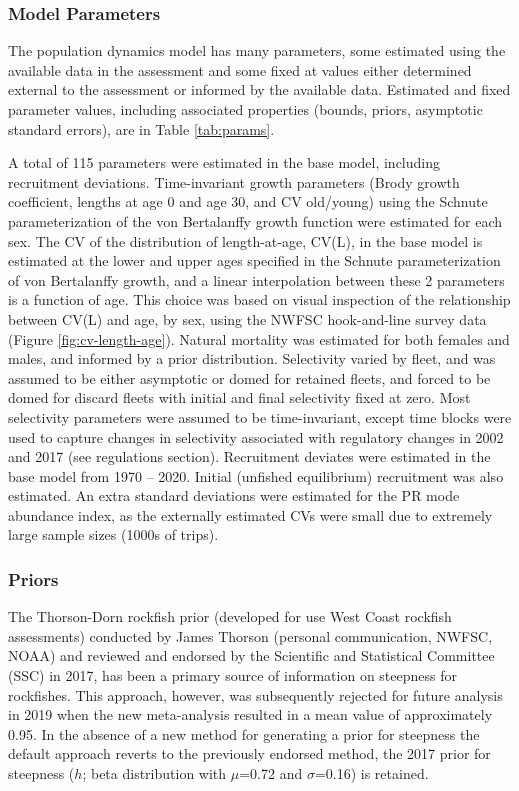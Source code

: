 \documentclass[
  english,
  a4paper,
]{article}
\begin{document}
\hypertarget{model-parameters}{%
\subsubsection{Model Parameters}\label{model-parameters}}

The population dynamics model has many parameters, some estimated using the available data in the assessment and some fixed at values either determined external to the assessment or informed by the available data. Estimated and fixed parameter values, including associated properties (bounds, priors, asymptotic standard errors), are in Table \ref{tab:params}.

A total of 115 parameters were estimated in the base model, including recruitment deviations. Time-invariant growth parameters (Brody growth coefficient, lengths at age 0 and age 30, and CV old/young) using the Schnute parameterization of the von Bertalanffy growth function were estimated for each sex. The CV of the distribution of length-at-age, CV(L), in the base model is estimated at the lower and upper ages specified in the Schnute parameterization of von Bertalanffy growth, and a linear interpolation between these 2 parameters is a function of age. This choice was based on visual inspection of the relationship between CV(L) and age, by sex, using the NWFSC hook-and-line survey data (Figure \ref{fig:cv-length-age}). Natural mortality was estimated for both females and males, and informed by a prior distribution. Selectivity varied by fleet, and was assumed to be either asymptotic or domed for retained fleets, and forced to be domed for discard fleets with initial and final selectivity fixed at zero. Most selectivity parameters were assumed to be time-invariant, except time blocks were used to capture changes in selectivity associated with regulatory changes in 2002 and 2017 (see regulations section). Recruitment deviates were estimated in the base model from 1970 -- 2020. Initial (unfished equilibrium) recruitment was also estimated. An extra standard deviations were estimated for the PR mode abundance index, as the externally estimated CVs were small due to extremely large sample sizes (1000s of trips).

\hypertarget{priors}{%
\subsubsection{Priors}\label{priors}}

The Thorson-Dorn rockfish prior (developed for use West Coast rockfish assessments) conducted by James Thorson (personal communication, NWFSC, NOAA) and reviewed and endorsed by the Scientific and Statistical Committee (SSC) in 2017, has been a primary source of information on steepness for rockfishes. This approach, however, was subsequently rejected for future analysis in 2019 when the new meta-analysis resulted in a mean value of approximately 0.95. In the absence of a new method for generating a prior for steepness the default approach reverts to the previously endorsed method, the 2017 prior for steepness (\(h\); beta distribution with \(\mu\)=0.72 and \(\sigma\)=0.16) is retained.
\end{document}
